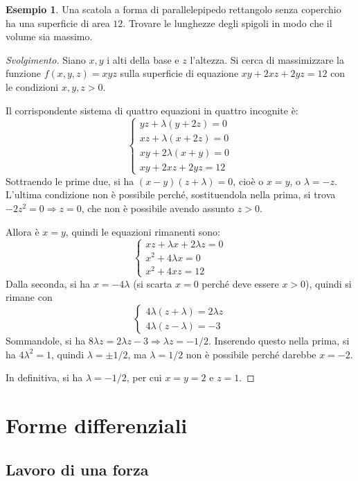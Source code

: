 \documentclass[10pt, a4paper]{scrartcl}
\newenvironment{svolgimento}{\renewcommand\qedsymbol{$\blacksquare$}\begin{proof}[Svolgimento]}{\end{proof}}
\theoremstyle{definition}
\newtheorem{esempio}{Esempio}
\numberwithin{esempio}{section}
\theoremstyle{definition}
\numberwithin{obs}{section}
\numberwithin{nota}{section}
\numberwithin{equation}{subsection}
\begin{document}
\begin{esempio}
Una scatola a forma di parallelepipedo rettangolo senza coperchio ha una superficie di area $12$. 
Trovare le lunghezze degli spigoli in modo che il volume sia massimo.
\begin{svolgimento}
	Siano $x,y$ i alti della base e $z$ l'altezza. 
	Si cerca di massimizzare la funzione $f(x,y,z) = xyz$ sulla superficie di equazione $xy + 2xz + 2yz = 12$ con le condizioni $x,y,z>0$.

	Il corrispondente sistema di quattro equazioni in quattro incognite \`e:
	\[
	\begin{cases}
		yz + \lambda (y+2z) = 0 \\
		xz + \lambda (x+2z) = 0\\
		xy + 2\lambda (x+y) = 0\\
		xy + 2xz + 2yz = 12
	\end{cases}
	\] 
	Sottraendo le prime due, si ha $(x-y) (z+\lambda ) = 0$, cio\`e o $x=y$, o $\lambda = -z$. 
	L'ultima condizione non \`e possibile perch\'e, sostituendola nella prima, si trova $-2z^2 = 0 \Rightarrow z= 0$, che non \`e possibile avendo assunto $z>0$.

	Allora \`e $x=y$, quindi le equazioni rimanenti sono:
	\[
	\begin{cases}
		xz + \lambda x + 2 \lambda z=0\\
		x^2 + 4\lambda  x = 0\\
		x^2 + 4xz = 12
	\end{cases}
	\] 
	Dalla seconda, si ha $x=-4\lambda $ (si scarta $x=0$ perch\'e deve essere $x>0$), quindi si rimane con
	\[
	\begin{cases}
		4\lambda (z+\lambda ) = 2\lambda z \\
		4\lambda (z-\lambda ) = -3
	\end{cases}
	\] 
	Sommandole, si ha $8\lambda z = 2\lambda z -  3\Rightarrow \lambda  z = -1 / 2$.
	Inserendo questo nella prima, si ha $4\lambda ^2 = 1$, quindi $\lambda  = \pm 1/2$, ma $\lambda  = 1 / 2$ non \`e possibile perch\'e darebbe $x = -2$.

	In definitiva, si ha $\lambda  = - 1  / 2$, per cui $x=y=2$ e $z=1$.
\end{svolgimento}
\end{esempio}

\newpage
\section{Forme differenziali}
\subsection{Lavoro di una forza}
\end{document}
